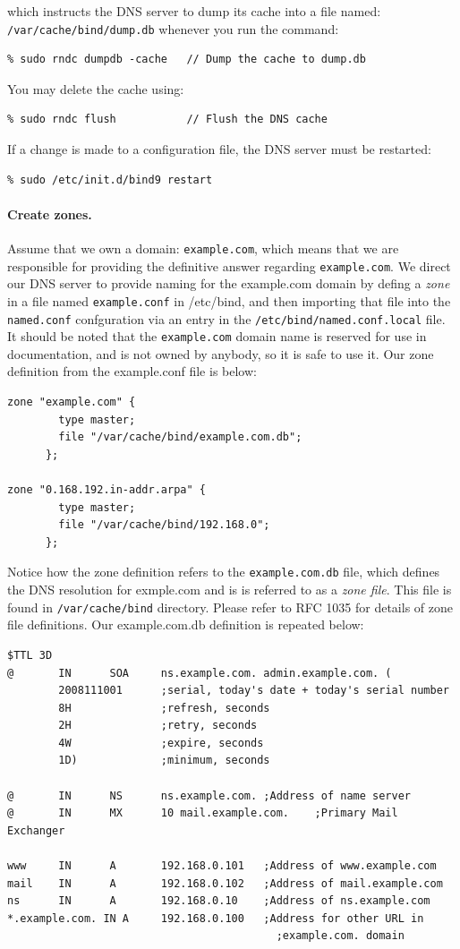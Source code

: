 \noindent which instructs the DNS server to dump its cache into
a file named: \texttt{/var/cache/bind/dump.db} 
whenever you run the command:
\begin{verbatim}
% sudo rndc dumpdb -cache 	// Dump the cache to dump.db  
\end{verbatim}
\noindent You may delete the cache using:
\begin{verbatim}
% sudo rndc flush         	// Flush the DNS cache
\end{verbatim}


If a change is made to a configuration file, the DNS server must be
restarted:
\begin{verbatim}
% sudo /etc/init.d/bind9 restart
\end{verbatim}


\paragraph{Create zones.}
Assume that we own a domain: {\tt example.com}, which means that we are 
responsible for providing the
definitive answer regarding {\tt example.com}. We direct our DNS server
to provide naming for the example.com domain by defing a \textit{zone}
in a file named {\tt example.conf} in /etc/bind, and then importing
that file into the {\tt named.conf} confguration via an entry in 
the {\tt /etc/bind/named.conf.local} file.
It should be noted that the {\tt example.com}
domain name is reserved for use in documentation, and is not owned
by anybody, so it is safe to use it.
Our zone definition from the example.conf file is below:
\begin{verbatim}
zone "example.com" {
        type master;
        file "/var/cache/bind/example.com.db";
      };

zone "0.168.192.in-addr.arpa" {
        type master;
        file "/var/cache/bind/192.168.0";
      };
\end{verbatim}

Notice how the zone definition refers to the {\tt example.com.db} file,
which defines the DNS resolution for exmple.com and is is referred 
to as a \textit{zone file}.  This file is found in \texttt{/var/cache/bind} directory.
Please refer to RFC 1035 for details of zone file definitions.  Our example.com.db 
definition is repeated below:
\begin{verbatim}
$TTL 3D
@       IN      SOA     ns.example.com. admin.example.com. (
        2008111001      ;serial, today's date + today's serial number
        8H              ;refresh, seconds
        2H              ;retry, seconds
        4W              ;expire, seconds
        1D)             ;minimum, seconds

@       IN      NS      ns.example.com.	;Address of name server
@       IN      MX      10 mail.example.com.	;Primary Mail Exchanger

www     IN      A       192.168.0.101	;Address of www.example.com
mail    IN      A       192.168.0.102	;Address of mail.example.com
ns      IN      A       192.168.0.10	;Address of ns.example.com
*.example.com. IN A     192.168.0.100	;Address for other URL in 
                                          ;example.com. domain
\end{verbatim}

